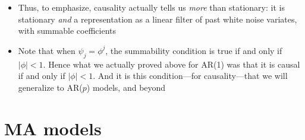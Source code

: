 \documentclass{article}
\begin{document}
\begin{itemize}
\item Thus, to emphasize, causality actually tells us \emph{more} than
  stationary: it is stationary \emph{and} a representation as a linear filter of
  past white noise variates, with summable coefficients

\item Note that when $\psi_j = \phi^j$, the summability condition
   is true if and only if $|\phi| <
  1$. Hence what we actually proved above for AR(1) was that it is causal if and
  only if $|\phi| < 1$. And it is this condition---for causality---that we will
  generalize to AR($p$) models, and beyond 
\end{itemize}

\section{MA models}
\end{document}
